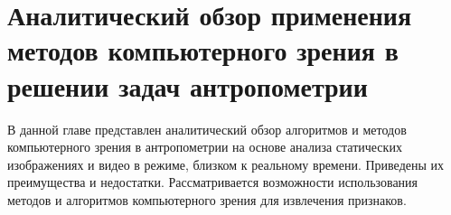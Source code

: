 \chapter{Аналитический обзор применения методов компьютерного зрения в решении задач антропометрии} \label{chapt1_intro}

В данной главе представлен аналитический обзор алгоритмов и методов компьютерного зрения в антропометрии на основе анализа статических изображениях и видео в режиме, близком к реальному времени. Приведены их преимущества и недостатки. Рассматривается возможности использования методов и алгоритмов компьютерного зрения для извлечения признаков. 




















